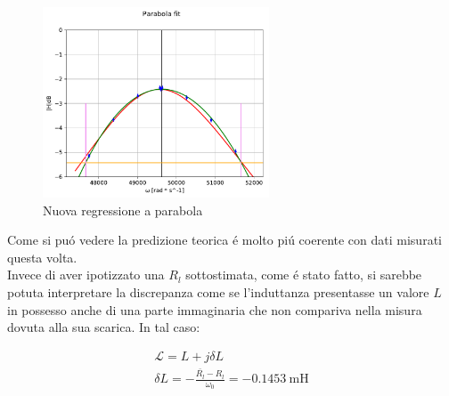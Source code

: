 \documentclass{article}
\begin{document}
\begin{figure}[h]
\centering
\includegraphics[width=0.6\textwidth]{bodeconf.pdf}
\caption{Nuova regressione a parabola}
\label{fig:bodeconfr}
\end{figure}
 
Come si pu\'o vedere la predizione teorica \'e molto pi\'u coerente con dati misurati questa volta. \\

Invece di aver ipotizzato una $R_l$ sottostimata, come \'e stato fatto, si sarebbe potuta interpretare la discrepanza come se l'induttanza presentasse un valore $L$ in possesso anche di una parte immaginaria che non compariva nella misura dovuta alla sua scarica.
In tal caso:

\begin{gather}
	\mathcal{L} = L + j\delta L \\
	\delta L = - \frac{\bar{R_l} - R_l}{\omega_0} = - 0.1453 \ \si{\milli\henry}
\end{gather}
\end{document}
